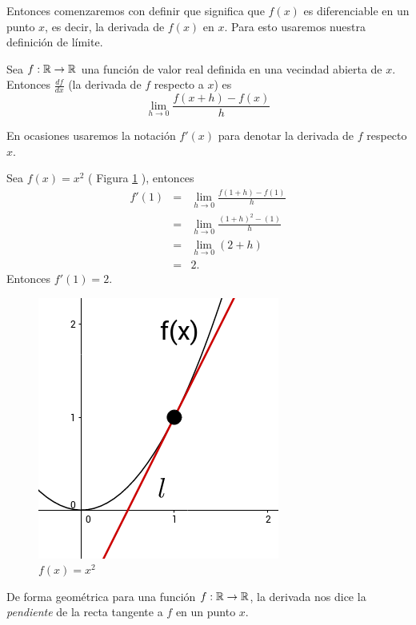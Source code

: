 Entonces comenzaremos con definir que significa que $f(x)$ es diferenciable en un punto $x$, es decir, la derivada de $f(x)$ en $x$. Para esto usaremos
nuestra definición de límite.

\begin{definition}
    Sea $f:\mathbb{R} \rightarrow \mathbb{R}$ una función de valor real definida en una vecindad abierta de $x$. Entonces $\frac{df}{dx}$ (la derivada de $f$ respecto a $x$) es
    $$ \lim_{h \rightarrow 0} \frac{f(x+h) - f(x)}{h} $$
\end{definition}

En ocasiones usaremos la notación $f'(x)$ para denotar la derivada de $f$ respecto $x$.

\begin{example}
    Sea $f(x)=x^{2}$ ( Figura \ref{fig:derivative} ), entonces
    \begin{eqnarray*}
        f'(1) &=& \lim_{h \rightarrow 0} \frac{f(1+h)-f(1)}{h} \\
              &=& \lim_{h \rightarrow 0} \frac{(1+h)^{2}-(1)}{h} \\
              &=& \lim_{h \rightarrow 0} (2 + h) \\
              &=& 2 \text{.}
    \end{eqnarray*}
    Entonces $f'(1) = 2$.
\end{example}

\begin{figure}[!ht]
  \begin{center}
      \includegraphics[width=0.5\linewidth]{gfx/derivative-example}
      \caption{$f(x)=x^{2}$}
      \label{fig:derivative}
  \end{center}
\end{figure}

De forma geométrica para una funci\'on $f:\mathbb{R} \rightarrow \mathbb{R}$, la derivada nos dice la \emph{pendiente} de la recta tangente a $f$ en un punto $x$.

